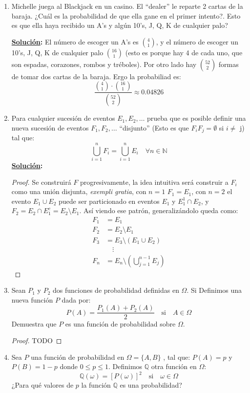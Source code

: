 \documentclass[11pt,letterpaper]{report}
\newcommand{\N}{\mathbb{N}}
\newcommand{\sol}{\textbf{\underline{Solución}: }} %
\begin{document}
\begin{enumerate}
\item Michelle juega al Blackjack en un casino. El ``dealer'' le reparte 2 cartas de la baraja.
¿Cuál es la probabilidad de que ella gane en el primer intento?. Esto es que ella haya
recibido un A's y algún 10's, J, Q, K de cualquier palo?

\sol El número de escoger un A's es $\binom{4}{1}$, y el número de escoger un 10's, J, Q, K de
cualquier palo $\binom{16}{1}$ (esto es porque hay 4 de cada uno, que son espadas, corazones, rombos
y tréboles). Por otro lado hay $\binom{52}{2}$ formas de tomar dos cartas de la baraja. Ergo la
probabiliad es:
\[
    \frac{\binom{4}{1} \cdot \binom{16}{1}}{\binom{52}{2}} \approx 0.04826
\]

\item Para cualquier sucesión de eventos $E_1, E_2, \ldots$ prueba que es posible definir una
nueva sucesión de eventos $F_1, F_2, \ldots$ ``disjunto'' (Esto es que $F_iF_j =\emptyset$
si $i \not=$ j) tal que:
\[
    \bigcup_{i=1}^{n} F_i = \bigcup_{i=1}^{n} E_i \quad \forall n \in \N
\]
\sol \begin{proof}
    Se construirá $F$ progresivamente, la idea intuitiva será construir a $F_i$
    como una unión disjunta, \textit{exempli gratia}, con $n=1$ $F_1 = E_1$,
    con $n=2$ el evento $E_1 \cup E_2$ puede ser particionado en eventos $E_1$ y $E_1^1 \cap E_2$,
    y $F_2 = E_2 \cap E_1^c = E_2 \setminus E_1$. Así viendo ese patrón, generalizándolo queda como:
    \begin{align*}
        F_1 &= E_1\\
        F_2 &= E_2 \setminus E_1\\
        F_3 &= E_3 \setminus (E_1 \cup E_2)\\
        &\quad\vdots\\
        F_n &= E_n \setminus (\bigcup_{j=1}^{n-1} E_j)
    \end{align*}
\end{proof}

\item Sean $P_1$ y $P_2$ dos funciones de probabilidad definidas en $\Omega$. Si Definimos una
nueva función $P$ dada por:
\[
    P(A) = \frac{P_1(A)+P_2(A)}{2} \quad \text{si} \quad A \in \Omega
\]
Demuestra que $P$ es una función de probabilidad sobre $\Omega$.
\begin{proof}
    TODO
\end{proof}

\item Sea $P$ una función de probabilidad en $\Omega= \{ A,B \}$ , tal que: $P(A)=p$ y
$P(B)=1-p$ donde $0 \leq p \leq1$.
Definimos $\mathds{Q}$ otra función en $\Omega$:
\[
    \mathds{Q}(\omega) = [P(\omega)]^2 \quad \text{si} \quad \omega \in \Omega
\]
¿Para qué valores de $p$ la función $\mathds{Q}$ es una probabilidad?


\end{enumerate}
\end{document}
